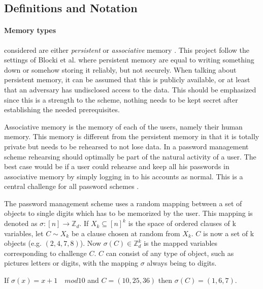 \subsection{Definitions and Notation}
\paragraph{Memory types} considered are either \emph{persistent} or \emph{associative} memory \cite{human-memory}. This project follow the settings of Blocki et al. \cite{naturally-rehearsing, hcp-blocki} where persistent memory are equal to writing something down or somehow storing it reliably, but not securely. When talking about persistent memory, it can be assumed that this is publicly available, or at least that an adversary has undisclosed access to the data. This should be emphasized since this is a strength to the scheme, nothing needs to be kept secret after establishing the needed prerequisites. 
    \par Associative memory is the memory of each of the users, namely their human memory. This memory is different from the persistent memory in that it is totally private but needs to be rehearsed to not lose data. In a password management scheme rehearsing should optimally be part of the natural activity of a user. The best case would be if a user could rehearse and keep all his passwords in associative memory by simply logging in to his accounts as normal. This is a central challenge for all password schemes \cite{naturally-rehearsing}.

The password management scheme uses a random mapping between a set of objects to single digits which has to be memorized by the user. This mapping is denoted as $\sigma : [n] \rightarrow \mathbb{Z}_d$. If $X_k \subseteq [n]^k$ is the space of ordered clauses of k variables, let $C\sim X_k$ be a clause chosen at random from $X_k$. $C$ is now a set of k objects (e.g. $(2,4,7,8)$). Now $\sigma (C) \in \mathbb{Z}_d^k$ is the mapped variables corresponding to challenge $C$. $C$ can consist of any type of object, such as pictures letters or digits, with the mapping $\sigma$ always being to digits.

\begin{example}
    If $\sigma(x) = x+1 \quad mod 10$ and $C = (10,25,36)$ then $\sigma(C) = (1,6,7)$.
\end{example}

